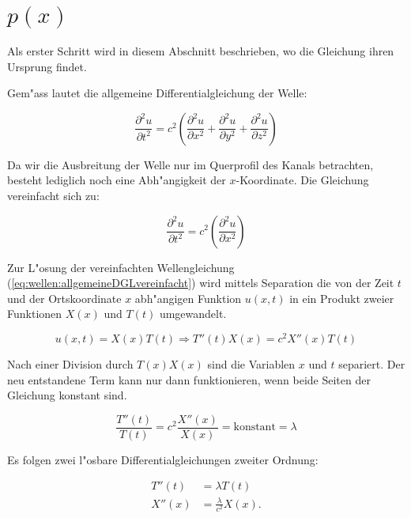 \section{\texorpdfstring{$p(x)$}{p(x)}}
Als erster Schritt wird in diesem Abschnitt beschrieben, wo die Gleichung ihren 
Ursprung findet.

Gem"ass \cite{wellen:smirnow2} lautet die allgemeine Differentialgleichung der 
Welle:

\begin{equation*}
	\frac{\partial^2 u}{\partial t^2}
	=
	c^2
	\left(
		\frac{\partial^2 u}{\partial x^2} 
		+ \frac{\partial^2 u}{\partial y^2} 
		+ \frac{\partial^2 u}{\partial z^2}
	\right)
	\label{eq:wellen:allgemeineDGL}
\end{equation*}

Da wir die Ausbreitung der Welle nur im Querprofil des Kanals betrachten, 
besteht lediglich noch eine Abh"angigkeit der $x$-Koordinate. Die Gleichung 
vereinfacht sich zu:

\begin{equation}
	\frac{\partial^2 u}{\partial t^2}
	=
	c^2
	\left(
		\frac{\partial^2 u}{\partial x^2} 
	\right)
	\label{eq:wellen:allgemeineDGLvereinfacht}
\end{equation}

Zur L"osung der vereinfachten Wellengleichung 
(\ref{eq:wellen:allgemeineDGLvereinfacht}) wird mittels Separation die von der 
Zeit $t$ und der Ortskoordinate $x$ abh"angigen Funktion $u(x,t)$ in ein 
Produkt zweier Funktionen $X(x)$ und $T(t)$ umgewandelt.

\begin{equation*}
	u (x,t) = X(x) T(t)
	\Rightarrow T''(t) X(x) = c^2 X''(x)T(t)
\end{equation*}

Nach einer Division durch $T(x)X(x)$ sind die Variablen $x$ und $t$ separiert. 
Der neu entstandene Term kann nur dann funktionieren, wenn beide Seiten der 
Gleichung konstant sind.

\begin{equation*}
	\frac{T''(t)}{T(t)}
	=
	c^2 \frac{X''(x)}{X(x)} = \text{konstant} = \lambda
\end{equation*}

Es folgen zwei l"osbare Differentialgleichungen zweiter Ordnung:

\begin{align*}
	T''(t) &= \lambda T(t) \\
	X''(x) &= \frac{\lambda}{c^2}X(x).
\end{align*}

